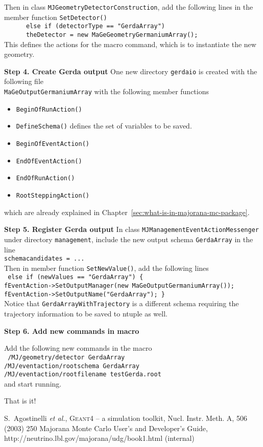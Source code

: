 \documentclass[a4paper,12pt,twoside]{article}
\begin{document}
Then in class {\tt MJGeometryDetectorConstruction},
add the following lines in the member function {\tt SetDetector()} \\
{\tt~~~~~      else if (detectorType == "GerdaArray") \\
    ~~~~~      theDetector = new MaGeGeometryGermaniumArray(); \\
}
This defines the actions for the macro command, which is to
instantiate the new geometry.

{\bf Step 4. Create Gerda output}
One new directory {\tt gerdaio} is created with the following file \\
{\tt MaGeOutputGermaniumArray} with the following member functions
\begin{itemize}
\item {\tt BeginOfRunAction()} 
\item {\tt DefineSchema()} defines the set of variables to be saved.
\item {\tt BeginOfEventAction()} 
\item {\tt EndOfEventAction()}
\item {\tt EndOfRunAction()}
\item {\tt RootSteppingAction()}
\end{itemize}
which are already explained in Chapter~\ref{sec:what-is-in-majorana-mc-package}.


{\bf Step 5. Register Gerda output}
In class {\tt MJManagementEventActionMessenger} under directory
{\tt management}, include the new output schema {\tt GerdaArray}
in the line \\
{\tt schemacandidates = ...} \\
Then in member function {\tt SetNewValue()}, add the following lines \\
{\tt
    else if (newValues == "GerdaArray") \{ \\
      fEventAction->SetOutputManager(new MaGeOutputGermaniumArray()); \\
      fEventAction->SetOutputName("GerdaArray"); \} \\
}
Notice that {\tt GerdaArrayWithTrajectory} is a different schema
requiring the trajectory information to be saved to ntuple as well.

{\bf Step 6. Add new commands in macro }

Add the following new commands in the macro \\
{\tt  
/MJ/geometry/detector GerdaArray \\
/MJ/eventaction/rootschema GerdaArray \\
/MJ/eventaction/rootfilename testGerda.root \\
}
and start running.

That is it!


\begin{thebibliography}{3}
 S.~Agostinelli \emph{et al.}, \textsc{Geant4} -- a
simulation toolkit, Nucl. Instr. Meth. A, 506 (2003) 250
 Majorana Monte Carlo User's and Developer's Guide, \\
http://neutrino.lbl.gov/majorana/udg/book1.html (internal)
\end{thebibliography}
\end{document}
